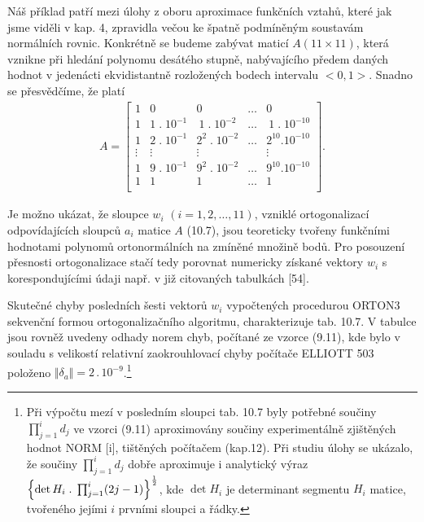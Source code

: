 {Náš příklad patří mezi úlohy z oboru aproximace funkčních
vztahů, které jak jsme viděli v kap. 4, zpravidla večou ke
špatně podmíněným soustavám normálních rovnic. Konkrétně se budeme
zabývat maticí $A(11 \times 11)$, která vznikne při hledání polynomu
desátého stupně, nabývajícího předem daných hodnot v jedenácti
ekvidistantně rozložených bodech intervalu $<0, 1>$. Snadno se
přesvědčíme, že platí
%
\begin{align*}
\tag{10.7} A =
\left[
\begin{array}{ccccc}
1 & 0            & 0              &  \ldots & 0 \\
1 & 1\;.\;10^{-1} & ~1\;.\;10^{-2}  & \ldots & ~1\;.\;10^{-10} \\
1 & 2\;.\;10^{-1} & 2^2\;.\;10^{-2} & \ldots & 2^{10}.10^{-10} \\
\vdots & \vdots & \vdots &   & \vdots\\
1 & 9\;.\;10^{-1} & 9^2\;.\;10^{-2} & \ldots & 9^{10}.10^{-10} \\
1 & 1            & 1              &  \ldots & 1 \\
\end{array}
\right].
\end{align*}

\noindent
Je možno ukázat, že sloupce $w_i$ $(i=1,2,\ldots,11)$, vzniklé
ortogonalizací odpovídajících sloupců $a_i$ matice $A$ (10.7), jsou
teoreticky tvořeny funkčními hodnotami polynomů ortonormálních na
zmíněné množině bodů. Pro posouzení přesnosti ortogonalizace stačí
tedy porovnat numericky získané vektory $w_i$ s korespondujícími údaji
např. v již citovaných tabulkách [54].

Skutečné chyby posledních šesti vektorů $w_i$ vypočtených
procedurou  ORTON3 sekvenční formou ortogonalizačního
algoritmu, charakterizuje tab. 10.7. V tabulce jsou rovněž uvedeny
odhady norem chyb, počítané ze vzorce (9.11), kde bylo v souladu s
velikostí relativní zaokrouhlovací chyby počítače ELLIOTT 503 položeno
$\Vert \delta_a \Vert = 2\,.\,10^{-9}$.\footnote{
Při výpočtu mezí v posledním sloupci tab. 10.7 byly
potřebné součiny $\prod_{j=1}^id_j$ ve vzorci (9.11) aproximovány součiny
experimentálně zjištěných hodnot NORM [i], tištěných počítačem
(kap.12). Při studiu úlohy se ukázalo, že součiny $\prod_{j=1}^id_j$
dobře aproximuje i analytický výraz
%
$\left\{ \det H_i \;.\; \prod_{j=1}^i (2j - 1)\right\}^{1\over2}$,
%
kde $\det H_i$ je determinant segmentu $H_i$  matice,
tvořeného jejími $i$ prvními sloupci a řádky.
}

}
